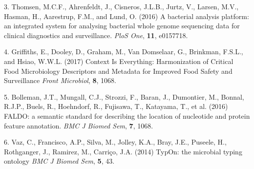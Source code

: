 \documentclass{article}
\begin{document}
3.
Thomsen, M.C.F., Ahrenfeldt, J., Cisneros, J.L.B., Jurtz, V., Larsen, M.V., Hasman, H., Aarestrup, F.M., and Lund, O. (2016)
A bacterial analysis platform: an integrated system for analysing bacterial whole genome sequencing data for clinical diagnostics and surveillance.
\textit{PloS One}, \textbf{11}, e0157718.

4.
Griffiths, E., Dooley, D., Graham, M., Van Domselaar, G., Brinkman, F.S.L., and Hsiao, W.W.L. (2017)
Context Is Everything: Harmonization of Critical Food Microbiology Descriptors and Metadata for Improved Food Safety and Surveillance
\textit{Front Microbiol}, \textbf{8}, 1068.

5.
Bolleman, J.T., Mungall, C.J., Strozzi, F., Baran, J., Dumontier, M., Bonnal, R.J.P., Buels, R., Hoehndorf, R., Fujisawa, T., Katayama, T., et al. (2016)
FALDO: a semantic standard for describing the location of nucleotide and protein feature annotation.
\textit{BMC J Biomed Sem}, \textbf{7}, 1068.

6.
Vaz, C., Francisco, A.P., Silva, M., Jolley, K.A., Bray, J.E., Puseele, H., Rothganger, J., Ramirez, M., Carri\c{c}o, J.A. (2014)
TypOn: the microbial typing ontology
\textit{BMC J Biomed Sem}, \textbf{5}, 43.
\end{document}
